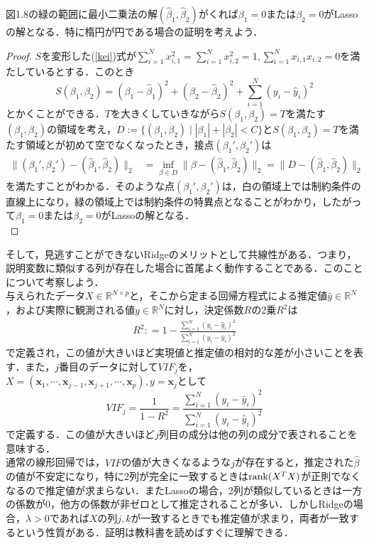 \documentclass{jsarticle}
\theoremstyle{definition}
\theoremstyle{mystyle} %
\begin{document}
図1.8の緑の範囲に最小二乗法の解$(\hat{\beta}_1,\hat{\beta}_2)$がくれば$\beta_1=0$または$\beta_2=0$がLassoの解となる．特に楕円が円である場合の証明を考えよう．
\begin{proof}
$S$を変形した(\ref{kei})式が$\displaystyle \sum_{i=1}^N x_{i,1}^2=\sum_{i=1}^N x_{i,2}^2=1,\sum_{i=1}^N x_{i,1}x_{i,2}=0$を満たしているとする．このとき
$$S(\beta_1,\beta_2)=(\beta_1-\hat{\beta}_1)^2+(\beta_2-\hat{\beta}_2)^2+\sum_{i=1}^N (y_i-\hat{y}_i)^2$$
とかくことができる．$T$を大きくしていきながら$S(\beta_1,\beta_2)=T$を満たす$(\beta_1,\beta_2)$の領域を考え，$D:=\{(\beta_1,\beta_2)\mid |\beta_1|+|\beta_2|<C\}$と$S(\beta_1,\beta_2)=T$を満たす領域とが初めて空でなくなったとき，接点$(\beta_1',\beta_2')$は
\begin{align*}
\|(\beta_1',\beta_2')-(\hat{\beta}_1,\hat{\beta}_2)\|_2&=\inf_{\beta \in D}\|\beta-(\hat{\beta}_1,\hat{\beta}_2)\|_2=\|D-(\hat{\beta}_1,\hat{\beta}_2)\|_2
\end{align*}
を満たすことがわかる．そのような点$(\beta_1',\beta_2')$は，白の領域上では制約条件の直線上になり，緑の領域上では制約条件の特異点となることがわかり，したがって$\beta_1=0$または$\beta_2=0$がLassoの解となる．\\
\end{proof}

そして，見逃すことができないRidgeのメリットとして共線性がある．つまり，説明変数に類似する列が存在した場合に首尾よく動作することである．このことについて考察しよう．\\

与えられたデータ$X\in\mathbb{R}^{N\times p}$と，そこから定まる回帰方程式による推定値$\hat{y}\in \mathbb{R}^N$，および実際に観測される値$y\in\mathbb{R}^N$に対し，決定係数$R$の2乗$R^2$は
\begin{align*}
R^2: =1-\frac{\displaystyle \sum_{i=1}^N(y_i-\hat{y}_i)^2}{\displaystyle \sum_{i=1}^N(y_i-\bar{y}_i)^2}
\end{align*}
で定義され，この値が大きいほど実現値と推定値の相対的な差が小さいことを表す．また，$j$番目のデータに対して$VIF_j$を，$X=({\bm x}_1,\cdots,{\bm x}_{j-1},{\bm x}_{j+1},\cdots,{\bm x}_p),y={\bm x}_j$として
$$VIF_j =\frac{1}{1-R^2}=\frac{\displaystyle \sum_{i=1}^N(y_i-\bar{y}_i)^2}{\displaystyle \sum_{i=1}^N(y_i-\hat{y}_i)^2}$$
で定義する．この値が大きいほど$j$列目の成分は他の列の成分で表されることを意味する．\\
通常の線形回帰では，$VIF$の値が大きくなるような$j$が存在すると，推定された$\hat{\beta}$の値が不安定になり，特に2列が完全に一致するときは${\rm rank}(X^TX)$が正則でなくなるので推定値が求まらない．またLassoの場合，2列が類似しているときは一方の係数が$0$，他方の係数が非ゼロとして推定されることが多い．しかしRidgeの場合，$\lambda>0$であれば$X$の列$j,k$が一致するときでも推定値が求まり，両者が一致するという性質がある．証明は教科書を読めばすぐに理解できる．\\
\end{document}
